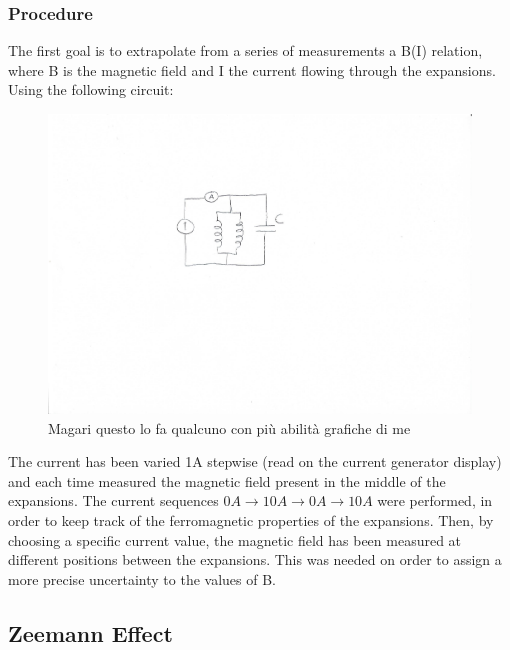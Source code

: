 \documentclass[a4paper,12pt,abstracton]{scrartcl}
\begin{document}
\subsubsection{Procedure}
The first goal is to extrapolate from a series of measurements a B(I) relation, where B is the magnetic field and I the current flowing through the expansions. 
Using the following circuit:
\begin{figure}[H]
\begin{center}
\includegraphics[page = 2,angle=90,origin=c]{circuitoprovvisorio.pdf} 
\caption{Magari questo lo fa qualcuno con più abilità grafiche di me}
\end{center} 
\end{figure}
The current has been varied 1A stepwise (read on the current generator display) and each time measured the magnetic field present in the middle of the expansions. The current sequences $0A \longrightarrow 10A \longrightarrow 0A \longrightarrow 10A$ were performed, in order to keep track of the ferromagnetic properties of the expansions.
Then, by choosing a specific current value, the magnetic field has been measured at different positions between the expansions. This was needed on order to assign a more precise uncertainty to the values of B.
\subsection{Zeemann Effect}
\end{document}
